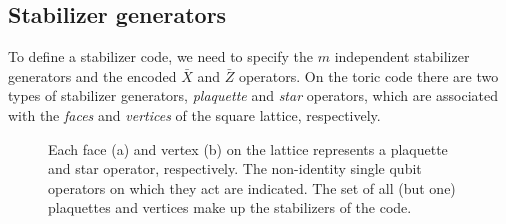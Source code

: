 \subsection{Stabilizer generators}

To define a stabilizer code, we need to specify the $m$ independent stabilizer generators and the encoded $\bar{X}$ and $\bar{Z}$ operators. On the toric code there are two types of stabilizer generators, \emph{plaquette} and \emph{star} operators, which are associated with the \emph{faces} and \emph{vertices} of the square lattice, respectively.

\begin{figure}
  \centering
  \hspace{1cm}
  
  \begin{center}
    \hspace{1cm}
  \end{center}
    
  \caption{Each face (a) and vertex (b) on the lattice represents a plaquette and star operator, respectively. The non-identity single qubit operators on which they act are indicated. The set of all (but one) plaquettes and vertices make up the stabilizers of the code. }\label{sf:fig_stabilizers}
\end{figure}

